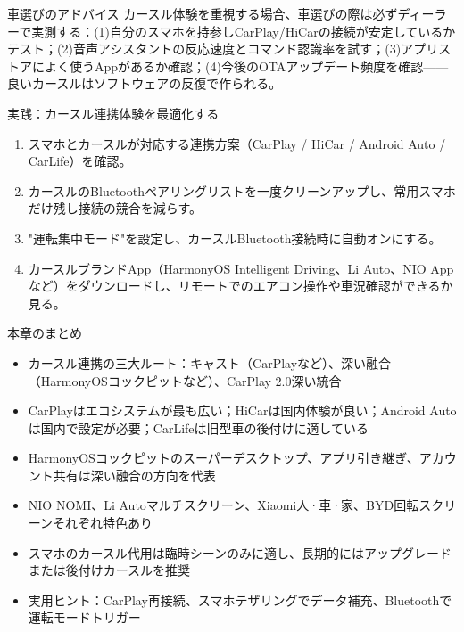 \begin{tcbinfo}{車選びのアドバイス}
カースル体験を重視する場合、車選びの際は必ずディーラーで実測する：(1)自分のスマホを持参しCarPlay/HiCarの接続が安定しているかテスト；(2)音声アシスタントの反応速度とコマンド認識率を試す；(3)アプリストアによく使うAppがあるか確認；(4)今後のOTAアップデート頻度を確認——良いカースルはソフトウェアの反復で作られる。

\end{tcbinfo}

\begin{tcbpractice}{実践：カースル連携体験を最適化する}
\begin{enumerate}
  \item スマホとカースルが対応する連携方案（CarPlay / HiCar / Android Auto / CarLife）を確認。
  \item カースルのBluetoothペアリングリストを一度クリーンアップし、常用スマホだけ残し接続の競合を減らす。
  \item "運転集中モード"を設定し、カースルBluetooth接続時に自動オンにする。
  \item カースルブランドApp（HarmonyOS Intelligent Driving、Li Auto、NIO Appなど）をダウンロードし、リモートでのエアコン操作や車況確認ができるか見る。
\end{enumerate}

\end{tcbpractice}

\begin{tcbsummary}{本章のまとめ}
\begin{itemize}
  \item カースル連携の三大ルート：キャスト（CarPlayなど）、深い融合（HarmonyOSコックピットなど）、CarPlay 2.0深い統合
  \item CarPlayはエコシステムが最も広い；HiCarは国内体験が良い；Android Autoは国内で設定が必要；CarLifeは旧型車の後付けに適している
  \item HarmonyOSコックピットのスーパーデスクトップ、アプリ引き継ぎ、アカウント共有は深い融合の方向を代表
  \item NIO NOMI、Li Autoマルチスクリーン、Xiaomi人·車·家、BYD回転スクリーンそれぞれ特色あり
  \item スマホのカースル代用は臨時シーンのみに適し、長期的にはアップグレードまたは後付けカースルを推奨
  \item 実用ヒント：CarPlay再接続、スマホテザリングでデータ補充、Bluetoothで運転モードトリガー
\end{itemize}

\end{tcbsummary}
